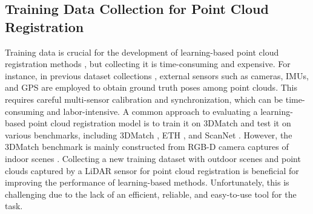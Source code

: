\subsection{Training Data Collection for Point Cloud Registration}
Training data is crucial for the development of learning-based point cloud registration methods \cite{sghr,mdgd}, but collecting it is time-consuming and expensive. For instance, in previous dataset collections \cite{3dmatch,eth,scan}, external sensors such as cameras, IMUs, and GPS are employed to obtain ground truth poses among point clouds. This requires careful multi-sensor calibration and synchronization, which can be time-consuming and labor-intensive. A common approach \cite{sghr,pre} to evaluating a learning-based point cloud registration model is to train it on 3DMatch \cite{3dmatch} and test it on various benchmarks, including 3DMatch \cite{3dmatch}, ETH \cite{eth}, and ScanNet \cite{scan}. However, the 3DMatch benchmark is mainly constructed from RGB-D camera captures of indoor scenes \cite{3dmatch}. Collecting a new training dataset with outdoor scenes and point clouds captured by a LiDAR sensor for point cloud registration is beneficial for improving the performance of learning-based methods. Unfortunately, this is challenging due to the lack of an efficient, reliable, and easy-to-use tool for the task.

